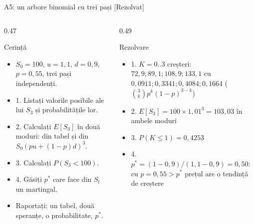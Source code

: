 \begin{frame}{A5: un arbore binomial cu trei pași [Rezolvat]}
\itemsize{\footnotesize}
\begin{columns}[T]
\begin{column}{0.47\textwidth}
\begin{block}{Cerință}
\begin{itemize}
    \item $S_0 = 100$, $u = 1{,}1$, $d = 0{,}9$, $p = 0{,}55$, trei pași independenți.
    \item 1. Listați valorile posibile ale lui $S_3$ și probabilitățile lor.
    \item 2. Calculați $E[S_3]$ în două moduri: din tabel și din $S_0(pu + (1 - p)d)^3$.
    \item 3. Calculați $P(S_3 < 100)$.
    \item 4. Găsiți $p^*$ care face din $S_t$ un martingal.
    \item Raportați: un tabel, două speranțe, o probabilitate, $p^*$.
\end{itemize}
\end{block}
\end{column}
\begin{column}{0.49\textwidth}
\begin{exampleblock}{Rezolvare}
\begin{itemize}
    \item 1. $K = 0..3$ creșteri: $72{,}9; 89{,}1; 108{,}9; 133{,}1$ cu $0{,}0911; 0{,}3341; 0{,}4084; 0{,}1664$ ($\binom{3}{k}p^k(1-p)^{3-k}$)
    \item 2. $E[S_3] = 100 \times 1{,}01^3 = 103{,}03$ în ambele moduri
    \item 3. $P(K \le 1) = 0{,}4253$
    \item 4. $p^* = (1 - 0{,}9)/(1{,}1 - 0{,}9) = 0{,}50$: cu $p = 0{,}55 > p^*$ prețul are o tendință de creștere
\end{itemize}
\end{exampleblock}
\end{column}
\end{columns}
\end{frame}

